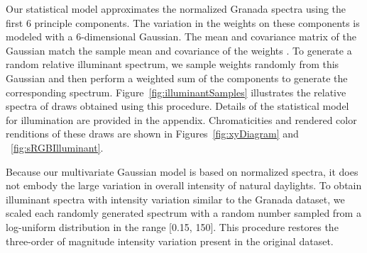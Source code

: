 \documentclass{jov}
\begin{document}
Our statistical model approximates the normalized Granada spectra using the first 6 principle components.
The variation in the weights on these components is modeled with a 6-dimensional Gaussian. The mean and covariance matrix of the Gaussian match the sample mean and covariance of the weights \cite{BrainardFreeman}. 
To generate a random relative illuminant spectrum, we sample weights randomly from this Gaussian and then perform a weighted sum of the components to generate the corresponding spectrum.
Figure~\ref{fig:illuminantSamples} illustrates the relative spectra of draws obtained using this procedure.
Details of the statistical model for illumination are provided in the appendix.
Chromaticities and rendered color renditions of these draws are shown in Figures~\ref{fig:xyDiagram} and ~\ref{fig:sRGBIlluminant}.

Because our multivariate Gaussian model is based on normalized spectra, it does not embody the large variation in overall intensity of natural daylights.
To obtain illuminant spectra with intensity variation similar to the Granada dataset, we scaled each randomly generated spectrum with a random number sampled from a log-uniform distribution in the range [0.15, 150]. This procedure restores the three-order of magnitude intensity variation present in the original dataset.
\end{document}
